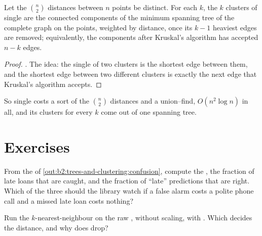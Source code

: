 \begin{theorem}\label{thm:b2:trees-and-clustering:single-linkage}
Let the $\binom{n}{2}$ distances between $n$ points be distinct. For each $k$, the $k$ clusters of single  are the
connected components of the minimum spanning tree of the complete graph on the points, weighted by distance, once its
$k - 1$ heaviest edges are removed; equivalently, the components after Kruskal's algorithm has accepted $n - k$ edges.
\end{theorem}

\begin{proof}
. The idea: the single  of two clusters is the shortest edge between them, and
the shortest edge between two different clusters is exactly the next edge that Kruskal's algorithm accepts.
\end{proof}

So single  costs a sort of the $\binom{n}{2}$ distances and a union--find, $O(n^2 \log n)$ in all, and its
clusters for every $k$ come out of one spanning tree.

\section{Exercises}\label{sec:b2:trees-and-clustering:exercises}

\begin{exercise}[$\star$]\label{exo:b2:trees-and-clustering:1}
From the  of \cref{out:b2:trees-and-clustering:confusion}, compute the , the fraction of late
loans that are caught, and the fraction of ``late'' predictions that are right. Which of the three should the library
watch if a false alarm costs a polite phone call and a missed late loan costs nothing?
\end{exercise}

\begin{exercise}[$\star$]\label{exo:b2:trees-and-clustering:2}
Run the $k$-nearest-neighbour  on the raw , without scaling, with . Which
 decides the distance, and why does  drop?
\end{exercise}

